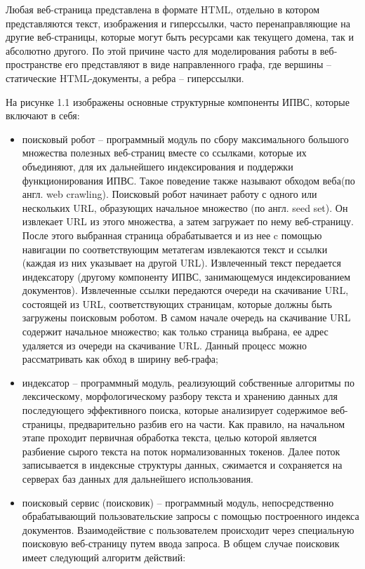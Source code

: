Любая веб-страница представлена в формате HTML, отдельно в котором представляются текст, изображения и гиперссылки, часто перенаправляющие на другие веб-страницы, которые могут быть ресурсами как текущего домена, так и абсолютно другого. По этой причине часто для моделирования работы в веб-пространстве его представляют в виде направленного графа, где вершины -- статические HTML-документы, а ребра -- гиперссылки.

На рисунке 1.1 изображены основные структурные компоненты ИПВС, которые включают в себя:
\begin{itemize}
\item поисковый робот -- программный модуль по сбору максимального большого множества полезных веб-страниц вместе со ссылками, которые их объединяют, для их дальнейшего индексирования и поддержки функционирования ИПВС. Такое поведение также называют обходом веба(по англ. web crawling). Поисковый робот начинает работу с одного или нескольких URL, образующих начальное множество (по англ. seed set). Он извлекает URL из этого множества, а затем загружает по нему веб-страницу. После этого выбранная страница обрабатывается и из нее c помощью навигации по соответствующим метатегам извлекаются текст и ссылки  (каждая из них указывает на другой URL). Извлеченный текст передается индексатору (другому компоненту ИПВС, занимающемуся индексированием документов). Извлеченные ссылки передаются очереди на скачивание URL, состоящей из URL, соответствующих страницам, которые должны быть загружены поисковым роботом. В самом начале очередь на скачивание URL содержит начальное множество; как только страница выбрана, ее адрес удаляется из очереди на скачивание URL. Данный процесс можно рассматривать как обход в ширину веб-графа;
\item индексатор -- программный модуль, реализующий собственные алгоритмы по лексическому, морфологическому разбору текста и хранению данных для последующего эффективного поиска, которые анализирует содержимое веб-страницы, предварительно разбив его на части. Как правило, на начальном этапе проходит первичная обработка текста, целью которой является разбиение сырого текста на поток нормализованных токенов. Далее поток записывается в индексные структуры данных, сжимается и сохраняется на серверах баз данных для дальнейшего использования.
\item поисковый сервис (поисковик) -- программный модуль, непосредственно обрабатывающий пользовательские запросы с помощью построенного индекса документов. Взаимодействие с пользователем происходит через специальную поисковую веб-страницу путем ввода запроса. В общем случае поисковик имеет следующий алгоритм действий:

\end{itemize}
